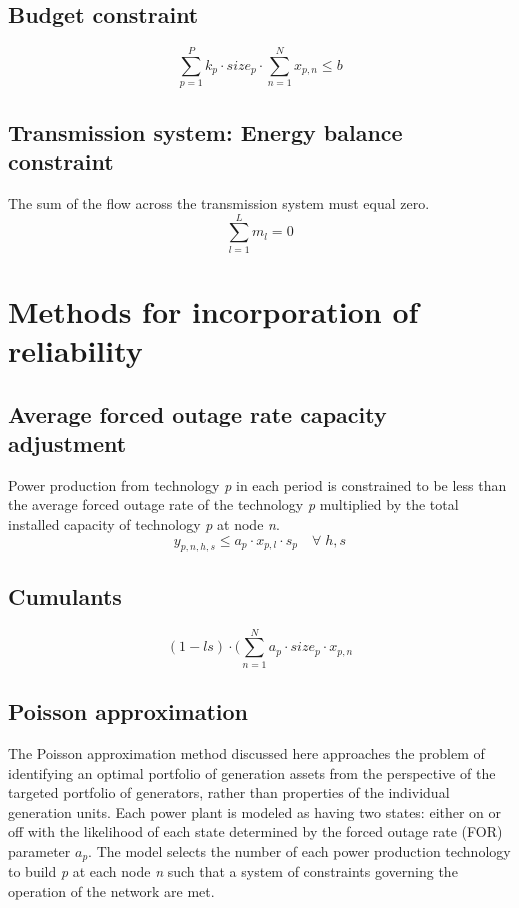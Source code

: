\documentclass[10pt]{amsart}
\begin{document}
\subsection{Budget constraint} 
\begin{equation}
\sum_{p=1}^{P} k_{p} \cdot size_{p} \cdot \sum_{n=1}^{N}x_{p,n} \leq b
\end{equation}
\subsection{Transmission system: Energy balance constraint}
The sum of the flow across the transmission system must equal zero.
\begin{equation}
\sum_{l=1}^{L} m_{l} = 0
\end{equation}
\section{Methods for incorporation of reliability}
\subsection{Average forced outage rate capacity adjustment}
Power production from technology \textit{p} in each period is constrained to be less than the average forced outage rate of the technology \textit{p} multiplied by the total installed capacity of technology \textit{p} at node \textit{n}.
\begin{equation}
y_{p,n,h,s} \leq a_{p} \cdot x_{p,l} \cdot s_{p} \quad \forall \; h,s
\end{equation}
\subsection{Cumulants}
\begin{equation}
(1 - ls)\cdot \big(\sum_{n=1}^{N} a_{p}\cdot size_{p} \cdot x_{p,n}
\end{equation}

\subsection{Poisson approximation}
The Poisson approximation method discussed here approaches the problem of identifying an optimal portfolio of generation assets from the perspective of the targeted portfolio of generators, rather than properties of the individual generation units.
Each power plant is modeled as having two states: either on or off with the likelihood of each state determined by the forced outage rate (FOR) parameter \textit{$a_{p}$}.
The model selects the number of each power production technology to build \textit{p} at each node \textit{n} such that a system of constraints governing the operation of the network are met.
\end{document}
